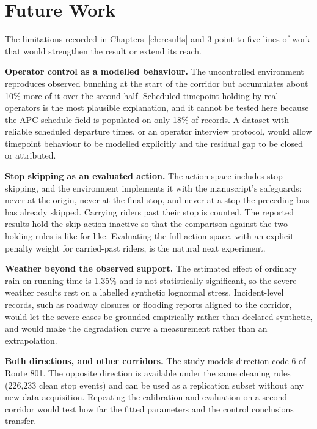 \chapter{Future Work}
\label{ch:futurework}


\hspace{\parindent} The limitations recorded in Chapters~\ref{ch:results} and 3 point to five lines of
work that would strengthen the result or extend its reach.

\textbf{Operator control as a modelled behaviour.} The uncontrolled environment reproduces observed
bunching at the start of the corridor but accumulates about 10\% more of it over the second half.
Scheduled timepoint holding by real operators is the most plausible explanation, and it cannot be tested
here because the APC schedule field is populated on only 18\% of records. A dataset with reliable
scheduled departure times, or an operator interview protocol, would allow timepoint behaviour to be
modelled explicitly and the residual gap to be closed or attributed.

\textbf{Stop skipping as an evaluated action.} The action space includes stop skipping, and the
environment implements it with the manuscript's safeguards: never at the origin, never at the final
stop, and never at a stop the preceding bus has already skipped. Carrying riders past their stop is
counted. The reported results hold the skip action inactive so that the comparison against the two
holding rules is like for like. Evaluating the full action space, with an explicit penalty weight for
carried-past riders, is the natural next experiment.

\textbf{Weather beyond the observed support.} The estimated effect of ordinary rain on running time is
1.35\% and is not statistically significant, so the severe-weather results rest on a labelled synthetic
lognormal stress. Incident-level records, such as roadway closures or flooding reports aligned to the
corridor, would let the severe cases be grounded empirically rather than declared synthetic, and would
make the degradation curve a measurement rather than an extrapolation.

\textbf{Both directions, and other corridors.} The study models direction code 6 of Route 801. The
opposite direction is available under the same cleaning rules (226{,}233 clean stop events) and can be
used as a replication subset without any new data acquisition. Repeating the calibration and evaluation
on a second corridor would test how far the fitted parameters and the control conclusions transfer.

